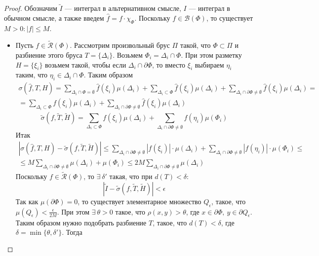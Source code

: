\begin{proof} Обозначим $\widetilde{I}$ --- интеграл в альтернативном смысле, $I$ --- интеграл в обычном смысле, а также введем $\widehat{f}=f\cdot \chi_{\Phi}$. Поскольку $f\in \mathcal{B}(\Phi)$, то существует $M>0: |f|\leq M$.
    \begin{itemize}
        \item[$(\Leftarrow)$:]
            Пусть $f\in \widetilde{\mathcal{R}}(\Phi)$. Рассмотрим произвольный брус $\Pi$ такой, что $\Phi\subset \Pi$ и разбиение этого бруса $T=\{\Delta_i\}$. Возьмем $\Phi_i=\Delta_i\cap \Phi$. При этом разметку $H=\{\xi_i\}$ возьмем такой, чтобы если $\Delta_i\cap \partial\Phi$, то вместо $\xi_i$ выбираем $\eta_i$ таким, что $\eta_i\in \Delta_i\cap \Phi$. Таким образом
            \begin{multline*}
                \sigma(\widehat{f}, T, H)=\sum\limits_{\Delta_i\cap \Phi=\emptyset}\widehat{f}(\xi_i)\mu(\Delta_i)+\sum\limits_{\Delta_i\subset \Phi}\widehat{f}(\xi_i)\mu(\Delta_i)+\sum\limits_{\Delta_i\cap \partial\Phi\neq \emptyset}\widehat{f}(\xi_i)\mu(\Delta_i)=\\
                =\sum\limits_{\Delta_i\subset \Phi}f(\xi_i)\mu(\Delta_i)+\sum\limits_{\Delta_i\cap \partial\Phi\neq \emptyset}\widehat{f}(\xi_i)\mu(\Delta_i)
            \end{multline*}
            \[\widetilde{\sigma}(f, \widetilde{T}, \widetilde{H})=\sum\limits_{\Delta_i\subset \Phi} f(\xi_i)\mu(\Delta_i)+\sum\limits_{\Delta_i\cap \partial\Phi\neq \emptyset}f(\eta_i)\mu(\Phi_i)\]
            Итак
            \begin{multline*}
                |\sigma(\widehat{f}, T, H)-\widetilde{\sigma}(f, \widetilde{T},\widetilde{H})|\leq \sum\limits_{\Delta_i\cap \partial\Phi\neq \emptyset}|f(\xi_i)|\cdot \mu(\Delta_i)+\sum\limits_{\Delta_i\cap \partial\Phi\neq \emptyset}|f(\eta_i)|\cdot \mu(\Phi_i)\leq\\
                \leq M \sum\limits_{\Delta_i\cap \partial\Phi\neq \emptyset}\mu(\Delta_i)+\mu(\Phi_i)\leq 2M \sum\limits_{\Delta_i\cap \partial\Phi\neq \emptyset}\mu(\Delta_i)
            \end{multline*}
            Поскольку $f\in \widetilde{\mathcal{R}}(\Phi)$, то $\exists\ \delta'$ такая, что при $d(T)<\delta$:
            \[|\widetilde{I}-\widetilde{\sigma}(f,\widetilde{T},\widetilde{H})|<\epsilon\]
            Так как $\mu(\partial\Phi)=0$, то существует элементарное множество $Q_{\epsilon}$, такое, что $\mu(Q_{\epsilon})<\frac{\epsilon}{2M}$. При этом $\exists\ \theta>0$ такое, что $\rho(x,y)>\theta$, где $x\in \partial\Phi,\ y\in \partial Q_{\epsilon}$. Таким образом нужно подобрать разбиение $T$, такое, что $d(T)<\delta$, где $\delta=\min\{\theta, \delta'\}$. Тогда

\end{itemize}
\end{proof}
